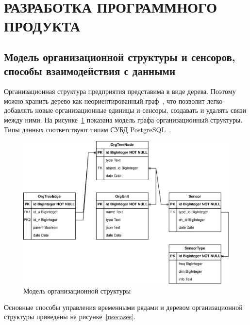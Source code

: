 \section{РАЗРАБОТКА ПРОГРАММНОГО ПРОДУКТА}

\subsection{Модель организационной структуры и сенсоров, способы взаимодействия с данными}

Организационная структура предприятия представима в виде дерева. Поэтому можно хранить дерево как неориентированный граф~\cite{graphs}, что позволит легко добавлять новые организационные единицы и сенсоры, создавать и удалять связи между ними. На рисунке~\ref{datamodel} показана модель графа организационный структуры. Типы данных соответствуют типам СУБД PostgreSQL~\cite{pg-datatypes}.

\begin{figure}
  \includegraphics[scale=0.75]{../img/pg.drawio.eps}
  \caption{Модель организационной структуры}
  \label{datamodel}
\end{figure}

Основные способы управления временными рядами и деревом организационной структуры приведены на рисунке~\ref{usecases}.

